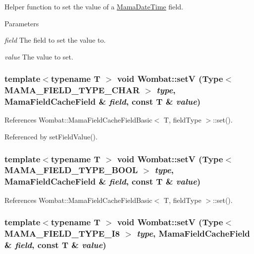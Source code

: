 Helper function to set the value of a \hyperlink{classWombat_1_1MamaDateTime}{MamaDateTime} field. 
\begin{DoxyParams}{Parameters}
\item[{\em field}]The field to set the value to. \item[{\em value}]The value to set. \end{DoxyParams}
\hypertarget{namespaceWombat_a2ae8b3003aa5519b6dfac49381383dc2}{
\subsubsection[{setV}]{\setlength{\rightskip}{0pt plus 5cm}template$<$typename T $>$ void Wombat::setV (Type$<$ MAMA\_\-FIELD\_\-TYPE\_\-CHAR $>$ {\em type}, \/  MamaFieldCacheField \& {\em field}, \/  const T \& {\em value})}}
\label{namespaceWombat_a2ae8b3003aa5519b6dfac49381383dc2}


References Wombat::MamaFieldCacheFieldBasic$<$ T, fieldType $>$::set().

Referenced by setFieldValue().\hypertarget{namespaceWombat_a676926737581099bd044cab9a2659027}{
\subsubsection[{setV}]{\setlength{\rightskip}{0pt plus 5cm}template$<$typename T $>$ void Wombat::setV (Type$<$ MAMA\_\-FIELD\_\-TYPE\_\-BOOL $>$ {\em type}, \/  MamaFieldCacheField \& {\em field}, \/  const T \& {\em value})}}
\label{namespaceWombat_a676926737581099bd044cab9a2659027}


References Wombat::MamaFieldCacheFieldBasic$<$ T, fieldType $>$::set().\hypertarget{namespaceWombat_a85b9c6736a5030bfd03fc14f01869d86}{
\subsubsection[{setV}]{\setlength{\rightskip}{0pt plus 5cm}template$<$typename T $>$ void Wombat::setV (Type$<$ MAMA\_\-FIELD\_\-TYPE\_\-I8 $>$ {\em type}, \/  MamaFieldCacheField \& {\em field}, \/  const T \& {\em value})}}
\label{namespaceWombat_a85b9c6736a5030bfd03fc14f01869d86}



